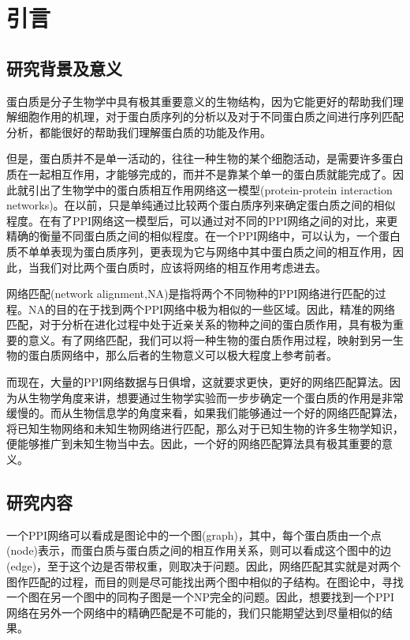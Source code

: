 \chapter{引言}
\section{研究背景及意义}
蛋白质是分子生物学中具有极其重要意义的生物结构，因为它能更好的帮助我们理解细胞作用的机理，对于蛋白质序列的分析以及对于不同蛋白质之间进行序列匹配分析，都能很好的帮助我们理解蛋白质的功能及作用。

但是，蛋白质并不是单一活动的，往往一种生物的某个细胞活动，是需要许多蛋白质在一起相互作用，才能够完成的，而并不是靠某个单一的蛋白质就能完成了。因此就引出了生物学中的蛋白质相互作用网络这一模型(protein-protein interaction networks)。在以前，只是单纯通过比较两个蛋白质序列来确定蛋白质之间的相似程度。在有了PPI网络这一模型后，可以通过对不同的PPI网络之间的对比，来更精确的衡量不同蛋白质之间的相似程度。在一个PPI网络中，可以认为，一个蛋白质不单单表现为蛋白质序列，更表现为它与网络中其中蛋白质之间的相互作用，因此，当我们对比两个蛋白质时，应该将网络的相互作用考虑进去。

网络匹配(network alignment,NA)是指将两个不同物种的PPI网络进行匹配的过程。NA的目的在于找到两个PPI网络中极为相似的一些区域。因此，精准的网络匹配，对于分析在进化过程中处于近亲关系的物种之间的蛋白质作用，具有极为重要的意义。有了网络匹配，我们可以将一种生物的蛋白质作用过程，映射到另一生物的蛋白质网络中，那么后者的生物意义可以极大程度上参考前者。

而现在，大量的PPI网络数据与日俱增\cite{breitkreutz2008biogrid,hulovatyy2014revealing}，这就要求更快，更好的网络匹配算法。因为从生物学角度来讲，想要通过生物学实验而一步步确定一个蛋白质的作用是非常缓慢的。而从生物信息学的角度来看，如果我们能够通过一个好的网络匹配算法，将已知生物网络和未知生物网络进行匹配，那么对于已知生物的许多生物学知识，便能够推广到未知生物当中去。因此，一个好的网络匹配算法具有极其重要的意义。

\section{研究内容}
一个PPI网络可以看成是图论中的一个图(graph)，其中，每个蛋白质由一个点(node)表示，而蛋白质与蛋白质之间的相互作用关系，则可以看成这个图中的边(edge)，至于这个边是否带权重，则取决于问题。因此，网络匹配其实就是对两个图作匹配的过程，而目的则是尽可能找出两个图中相似的子结构。在图论中，寻找一个图在另一个图中的同构子图是一个NP完全的问题\cite{cook1971complexity}。因此，想要找到一个PPI网络在另外一个网络中的精确匹配是不可能的，我们只能期望达到尽量相似的结果。

